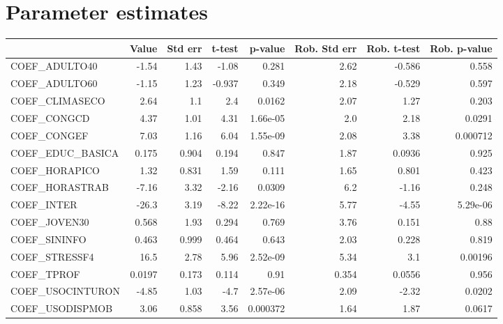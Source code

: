 \section{Parameter estimates}
\begin{tabular}{lrrrrrrr}
\toprule
{} &  Value &  Std err &  t-test &  p-value &  Rob. Std err &  Rob. t-test &  Rob. p-value \\
\midrule
COEF\_ADULTO40      &  -1.54 &     1.43 &   -1.08 &    0.281 &          2.62 &       -0.586 &         0.558 \\
COEF\_ADULTO60      &  -1.15 &     1.23 &  -0.937 &    0.349 &          2.18 &       -0.529 &         0.597 \\
COEF\_CLIMASECO     &   2.64 &      1.1 &     2.4 &   0.0162 &          2.07 &         1.27 &         0.203 \\
COEF\_CONGCD        &   4.37 &     1.01 &    4.31 & 1.66e-05 &           2.0 &         2.18 &        0.0291 \\
COEF\_CONGEF        &   7.03 &     1.16 &    6.04 & 1.55e-09 &          2.08 &         3.38 &      0.000712 \\
COEF\_EDUC\_BASICA   &  0.175 &    0.904 &   0.194 &    0.847 &          1.87 &       0.0936 &         0.925 \\
COEF\_HORAPICO      &   1.32 &    0.831 &    1.59 &    0.111 &          1.65 &        0.801 &         0.423 \\
COEF\_HORASTRAB     &  -7.16 &     3.32 &   -2.16 &   0.0309 &           6.2 &        -1.16 &         0.248 \\
COEF\_INTER         &  -26.3 &     3.19 &   -8.22 & 2.22e-16 &          5.77 &        -4.55 &      5.29e-06 \\
COEF\_JOVEN30       &  0.568 &     1.93 &   0.294 &    0.769 &          3.76 &        0.151 &          0.88 \\
COEF\_SININFO       &  0.463 &    0.999 &   0.464 &    0.643 &          2.03 &        0.228 &         0.819 \\
COEF\_STRESSF4      &   16.5 &     2.78 &    5.96 & 2.52e-09 &          5.34 &          3.1 &       0.00196 \\
COEF\_TPROF         & 0.0197 &    0.173 &   0.114 &     0.91 &         0.354 &       0.0556 &         0.956 \\
COEF\_USOCINTURON   &  -4.85 &     1.03 &    -4.7 & 2.57e-06 &          2.09 &        -2.32 &        0.0202 \\
COEF\_USODISPMOB    &   3.06 &    0.858 &    3.56 & 0.000372 &          1.64 &         1.87 &        0.0617 \\

\end{tabular}
